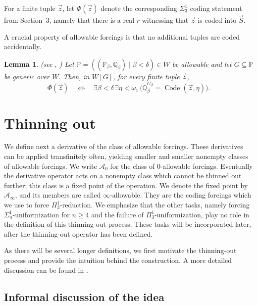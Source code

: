 \documentclass[a4paper,11pt]{article}
\newtheorem{lemma}[theorem]{Lemma}
\newcommand{\forceP}{\mathbb{P}}
\newcommand{\forceQ}{\mathbb{Q}}
\begin{document}
    For a finite tuple $\vec z$, let $\Phi(\vec z)$ denote the corresponding $\Sigma^1_3$ coding statement from Section~3, namely that there is a real $r$ witnessing that $\vec z$ is coded into $\vec S$.

    A crucial property of allowable forcings is that no additional tuples are coded accidentally.

    \begin{lemma}\label{nounwantedcodes}(see \cite{Reduction}, \cite{Uniformization})
    Let $\forceP=((\forceP_\beta,\dot{\forceQ}_\beta)\mid\beta<\delta)\in W$ be allowable and let $G\subseteq\forceP$ be generic over $W$. Then, in $W[G]$, for every finite tuple $\vec z$,
    \[
    \Phi(\vec z)
    \quad\Longleftrightarrow\quad
    \exists\beta<\delta\,\exists\eta<\omega_1\,
    \bigl(\dot{\forceQ}_\beta^{G_\beta}=\operatorname{Code}(\vec z,\eta)\bigr).
    \]
    \end{lemma}
    
    
    \section{Thinning out}

We define next a derivative of the class of allowable forcings. These derivatives can be applied transfinitely often, yielding smaller and smaller nonempty classes of allowable forcings. We write $\mathcal A_0$ for the class of $0$-allowable forcings. Eventually the derivative operator acts on a nonempty class which cannot be thinned out further; this class is a fixed point of the operation. We denote the fixed point by $\mathcal A_\infty$, and its members are called $\infty$-allowable. They are the coding forcings which we use to force $\Pi^1_3$-reduction. We emphasize that the other tasks, namely forcing $\Sigma^1_n$-uniformization for $n\geq 4$ and the failure of $\Pi^1_3$-uniformization, play no role in the definition of this thinning-out process. These tasks will be incorporated later, after the thinning-out operator has been defined.

As there will be several longer definitions, we first motivate the thinning-out process and provide the intuition behind the construction. A more detailed discussion can be found in \cite{Reduction}.

\subsection{Informal discussion of the idea}
\end{document}
